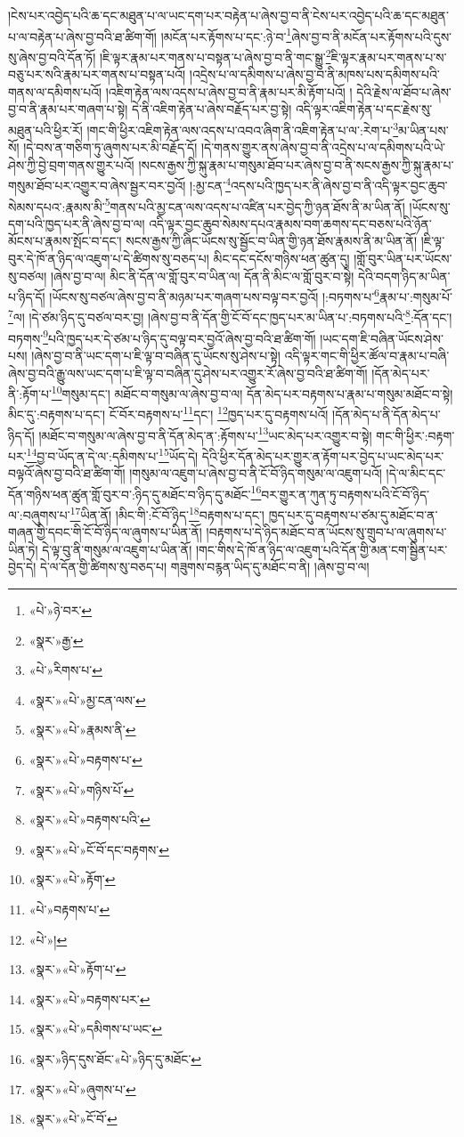 །ངེས་པར་འབྱེད་པའི་ཆ་དང་མཐུན་པ་ལ་ཡང་དག་པར་བརྟེན་པ་ཞེས་བྱ་བ་ནི་ངེས་པར་འབྱེད་པའི་ཆ་དང་མཐུན་པ་ལ་བརྟེན་པ་ཞེས་བྱ་བའི་ཐ་ཚིག་གོ། །མངོན་པར་རྟོགས་པ་དང་:ཉེ་བ་\footnote{«པེ་»ཉེ་བར་}ཞེས་བྱ་བ་ནི་མངོན་པར་རྟོགས་པའི་དུས་སུ་ཞེས་བྱ་བའི་དོན་ཏོ། །ཇི་ལྟར་རྣམ་པར་གནས་པ་བསྟན་པ་ཞེས་བྱ་བ་ནི་གང་སྒྱུ་\footnote{«སྣར་»རྒྱ་}ཇི་ལྟར་རྣམ་པར་གནས་པ་ས་བཅུ་པར་སའི་རྣམ་པར་གནས་པ་བསྟན་པའོ། །འདྲེས་པ་ལ་དམིགས་པ་ཞེས་བྱ་བ་ནི་མཁས་པས་དམིགས་པའི་གནས་ལ་དམིགས་པའོ། །འཇིག་རྟེན་ལས་འདས་པ་ཞེས་བྱ་བ་ནི་རྣམ་པར་མི་རྟོག་པའོ། །
དེའི་རྗེས་ལ་ཐོབ་པ་ཞེས་བྱ་བ་ནི་རྣམ་པར་གཞག་པ་སྟེ། དེ་ནི་འཇིག་རྟེན་པ་ཞེས་བརྗོད་པར་བྱ་སྟེ། འདི་ལྟར་འཇིག་རྟེན་པ་དང་རྗེས་སུ་མཐུན་པའི་ཕྱིར་རོ། །གང་གི་ཕྱིར་འཇིག་རྟེན་ལས་འདས་པ་འབའ་ཞིག་ནི་འཇིག་རྟེན་པ་ལ་:རེག་པ་\footnote{«པེ་»རིགས་པ་}མ་ཡིན་པས་སོ། །དེ་བས་ན་གཅིག་ཏུ་ཞུགས་པར་མི་བརྗོད་དོ། །དེ་གནས་གྱུར་ནས་ཞེས་བྱ་བ་ནི་འདྲེས་པ་ལ་དམིགས་པའི་ཡེ་ཤེས་ཀྱི་བྱེ་བྲག་གནས་གྱུར་པའོ། །སངས་རྒྱས་ཀྱི་སྐུ་རྣམ་པ་གསུམ་ཐོབ་པར་ཞེས་བྱ་བ་ནི་སངས་རྒྱས་ཀྱི་སྐུ་རྣམ་པ་གསུམ་ཐོབ་པར་འགྱུར་བ་ཞེས་སྦྱར་བར་བྱའོ། །:མྱ་ངན་\footnote{«སྣར་»«པེ་»མྱ་ངན་ལས་}འདས་པའི་ཁྱད་པར་ནི་ཞེས་བྱ་བ་ནི་འདི་ལྟར་བྱང་ཆུབ་སེམས་དཔའ་:རྣམས་མི་\footnote{«སྣར་»«པེ་»རྣམས་ནི་}གནས་པའི་མྱ་ངན་ལས་འདས་པ་འཛིན་པར་བྱེད་ཀྱི་ཉན་ཐོས་ནི་མ་ཡིན་ནོ། །ཡོངས་སུ་དག་པའི་ཁྱད་པར་ནི་ཞེས་བྱ་བ་ལ། འདི་ལྟར་བྱང་ཆུབ་སེམས་དཔའ་རྣམས་བག་ཆགས་དང་བཅས་པའི་ཉོན་མོངས་པ་རྣམས་སྤོང་བ་དང་། སངས་རྒྱས་ཀྱི་ཞིང་ཡོངས་སུ་སྦྱོང་བ་ཡིན་གྱི་ཉན་ཐོས་རྣམས་ནི་མ་ཡིན་ནོ། །ཇི་ལྟ་བུར་དེ་ཁོ་ན་ཉིད་ལ་འཇུག་པ་དེ་ཚིགས་སུ་བཅད་པ། མིང་དང་དངོས་གཉིས་ཕན་ཚུན་དུ། །གློ་བུར་ཡིན་པར་ཡོངས་སུ་བཙལ། །ཞེས་བྱ་བ་ལ། མིང་ནི་དོན་ལ་གློ་བུར་བ་ཡིན་ལ། དོན་ནི་མིང་ལ་གློ་བུར་བ་སྟེ། དེའི་བདག་ཉིད་མ་ཡིན་པ་ཉིད་དོ། །ཡོངས་སུ་བཙལ་ཞེས་བྱ་བ་ནི་མཉམ་པར་གཞག་པས་བལྟ་བར་བྱའོ། །:བཏགས་པ་\footnote{«སྣར་»«པེ་»བརྟགས་པ་}རྣམ་པ་:གསུམ་པོ་\footnote{«སྣར་»«པེ་»གཉིས་པོ་}ལ། །དེ་ཙམ་ཉིད་དུ་བཙལ་བར་བྱ། །ཞེས་བྱ་བ་ནི་དོན་གྱི་ངོ་བོ་དང་ཁྱད་པར་མ་ཡིན་པ་:བཏགས་པའི་\footnote{«སྣར་»«པེ་»བརྟགས་པའི་}:དོན་དང་། བཏགས་\footnote{«སྣར་»«པེ་»ངོ་བོ་དང་བརྟགས་}པའི་ཁྱད་པར་དེ་ཙམ་པ་ཉིད་དུ་བལྟ་བར་བྱའོ་ཞེས་བྱ་བའི་ཐ་ཚིག་གོ། །ཡང་དག་ཇི་བཞིན་ཡོངས་ཤེས་པས། །ཞེས་བྱ་བ་ནི་ཡང་དག་པ་ཇི་ལྟ་བ་བཞིན་དུ་ཡོངས་སུ་ཤེས་པ་སྟེ། འདི་ལྟར་གང་གི་ཕྱིར་ཚོལ་བ་རྣམ་པ་བཞི་ཞེས་བྱ་བའི་རྒྱུ་ལས་ཡང་དག་པ་ཇི་ལྟ་བ་བཞིན་དུ་ཤེས་པར་འགྱུར་རོ་ཞེས་བྱ་བའི་ཐ་ཚིག་གོ། །དོན་མེད་པར་ནི་:རྟོག་པ་\footnote{«སྣར་»«པེ་»རྟོག་}གསུམ་དང་། མཐོང་བ་གསུམ་ལ་ཞེས་བྱ་བ་ལ། དོན་མེད་པར་བརྟགས་པ་རྣམ་པ་གསུམ་མཐོང་བ་སྟེ། མིང་དུ་:བརྟགས་པ་དང་། ངོ་བོར་བརྟགས་པ་\footnote{«པེ་»བརྟགས་པ་}དང་། \footnote{«པེ་»།  }ཁྱད་པར་དུ་བརྟགས་པའོ། །དོན་མེད་པ་ནི་དོན་མེད་པ་ཉིད་དོ། །མཐོང་བ་གསུམ་ལ་ཞེས་བྱ་བ་ནི་དོན་མེད་ན་:རྟོགས་པ་\footnote{«སྣར་»«པེ་»རྟོག་པ་}ཡང་མེད་པར་འགྱུར་བ་སྟེ། གང་གི་ཕྱིར་:བརྟག་པར་\footnote{«སྣར་»«པེ་»བརྟགས་པར་}བྱ་བ་ཡོད་ན་དེ་ལ་:དམིགས་པ་\footnote{«སྣར་»«པེ་»དམིགས་པ་ཡང་}ཡོད་དེ། དེའི་ཕྱིར་དོན་མེད་པར་གྱུར་ན་རྟོག་པར་བྱེད་པ་ཡང་མེད་པར་བལྟའོ་ཞེས་བྱ་བའི་ཐ་ཚིག་གོ། །གསུམ་ལ་འཇུག་པ་ཞེས་བྱ་བ་ནི་ངོ་བོ་ཉིད་གསུམ་ལ་འཇུག་པའོ། །དེ་ལ་མིང་དང་དོན་གཉིས་ཕན་ཚུན་གློ་བུར་བ་:ཉིད་དུ་མཐོང་བ་ཉིད་དུ་མཐོང་\footnote{«སྣར་»ཉིད་དུས་ཐོང་«པེ་»ཉིད་དུ་མཐོང་}བར་གྱུར་ན་ཀུན་ཏུ་བརྟགས་པའི་ངོ་བོ་ཉིད་ལ་:བཞུགས་པ་\footnote{«སྣར་»«པེ་»ཞུགས་པ་}ཡིན་ནོ། །མིང་གི་:ངོ་བོ་ཉིད་\footnote{«སྣར་»«པེ་»ངོ་བོ་}བརྟགས་པ་དང་། ཁྱད་པར་དུ་བརྟགས་པ་ཙམ་དུ་མཐོང་བ་ན་གཞན་གྱི་དབང་གི་ངོ་བོ་ཉིད་ལ་ཞུགས་པ་ཡིན་ནོ། །བརྟགས་པ་དེ་ཉིད་མཐོང་བ་ན་ཡོངས་སུ་གྲུབ་པ་ལ་ཞུགས་པ་ཡིན་ཏེ། དེ་ལྟ་བུ་ནི་གསུམ་ལ་འཇུག་པ་ཡིན་ནོ། །གང་གིས་དེ་ཁོ་ན་ཉིད་ལ་འཇུག་པའི་དོན་གྱི་མན་ངག་སྦྱིན་པར་བྱེད་དེ། དེ་ལ་དོན་གྱི་ཚིགས་སུ་བཅད་པ། གཟུགས་བརྙན་ཡིད་དུ་མཐོང་བ་ནི། །ཞེས་བྱ་བ་ལ། 
